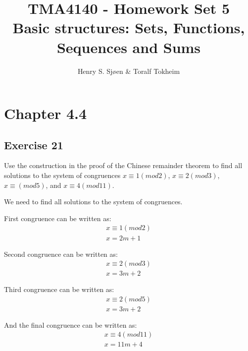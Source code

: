 \documentclass[12pt]{article}
\author{Henry S. Sjøen \& Toralf Tokheim}
\title{
  \textbf{TMA4140 - Homework Set 5}\\
  Basic structures: Sets, Functions, Sequences and Sums\\
    \color{darkred}{\textbf{RETTES}}
  }
\begin{document}
    \maketitle
    \thispagestyle{empty}
    \pagebreak
    \tableofcontents
    \pagebreak
    
    \section{Chapter 4.4}
    \subsection{Exercise 21}
    Use the construction in the proof of the Chinese remainder theorem to find all solutions to the system of congruences $x \equiv 1(mod 2)$, $x \equiv 2 (mod 3)$, $x \equiv (mod 5)$, and $x \equiv 4 (mod 11)$.
  
    We need to find all solutions to the system of congruences.

    First congruence can be written as:
    \begin{equation}
      \begin{split}
        x \equiv  1(mod2)\\
        x = 2m + 1
      \end{split}
    \end{equation}
    
    Second congruence can be written as:
    \begin{equation}
      \begin{split}
        x \equiv  2(mod3)\\
        x = 3m + 2
      \end{split}
    \end{equation}
    
    Third congruence can be written as:
    \begin{equation}
      \begin{split}
      x \equiv  2(mod5)\\
      x = 3m + 2
      \end{split}
    \end{equation}

    And the final congruence can be written as:
    \begin{equation}
      \begin{split}
        x \equiv 4(mod11)\\
        x = 11m+4
      \end{split}
    \end{equation}
\end{document}
